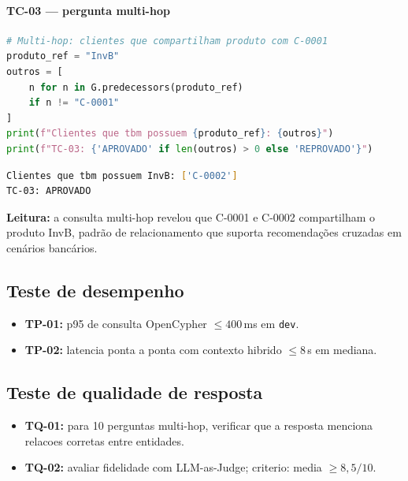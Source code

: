 \paragraph{TC-03 --- pergunta multi-hop}

\begin{lstlisting}[language=Python,
      caption={TC-03 --- recupera\c{c}\~ao de clientes que compartilham produto.},
      label={lst:cap9_tc03_codigo}]
# Multi-hop: clientes que compartilham produto com C-0001
produto_ref = "InvB"
outros = [
    n for n in G.predecessors(produto_ref)
    if n != "C-0001"
]
print(f"Clientes que tbm possuem {produto_ref}: {outros}")
print(f"TC-03: {'APROVADO' if len(outros) > 0 else 'REPROVADO'}")
\end{lstlisting}

\begin{lstlisting}[language=bash,
      caption={TC-03 --- resultado multi-hop mostrando relacionamento entre clientes.},
      label={lst:cap9_tc03_saida}]
Clientes que tbm possuem InvB: ['C-0002']
TC-03: APROVADO
\end{lstlisting}

\noindent\textbf{Leitura:} a consulta multi-hop revelou que C-0001 e
C-0002 compartilham o produto InvB, padr\~ao de relacionamento que
suporta recomenda\c{c}\~oes cruzadas em cen\'arios banc\'arios.

\subsection{Teste de desempenho}

\begin{itemize}[leftmargin=*]
  \item \textbf{TP-01:} p95 de consulta OpenCypher $\leq 400$\,ms em \texttt{dev}.
  \item \textbf{TP-02:} latencia ponta a ponta com contexto hibrido
        $\leq 8$\,s em mediana.
\end{itemize}

\subsection{Teste de qualidade de resposta}

\begin{itemize}[leftmargin=*]
  \item \textbf{TQ-01:} para 10 perguntas multi-hop, verificar que a
        resposta menciona relacoes corretas entre entidades.
  \item \textbf{TQ-02:} avaliar fidelidade com LLM-as-Judge;
        criterio: media $\geq 8{,}5/10$.
\end{itemize}


